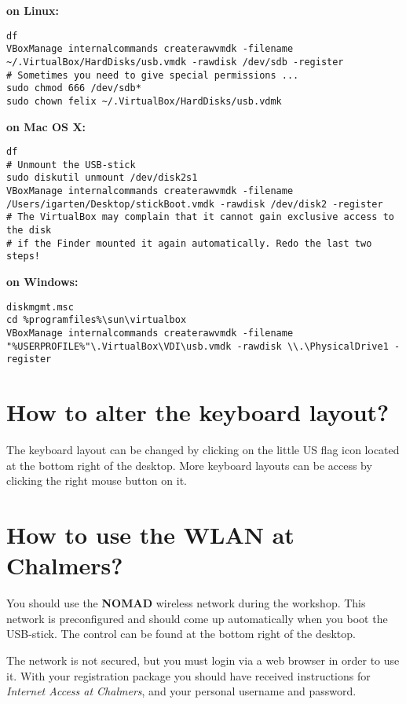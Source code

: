 \documentclass[11pt,a4paper,twocolumn]{article}
\begin{document}
\begin{htmlonly}

{\bf on Linux:}
\begin{verbatim}
df
VBoxManage internalcommands createrawvmdk -filename ~/.VirtualBox/HardDisks/usb.vmdk -rawdisk /dev/sdb -register
# Sometimes you need to give special permissions ...
sudo chmod 666 /dev/sdb*
sudo chown felix ~/.VirtualBox/HardDisks/usb.vdmk
\end{verbatim}

{\bf on Mac OS X:}
\begin{verbatim}
df
# Unmount the USB-stick
sudo diskutil unmount /dev/disk2s1
VBoxManage internalcommands createrawvmdk -filename /Users/igarten/Desktop/stickBoot.vmdk -rawdisk /dev/disk2 -register
# The VirtualBox may complain that it cannot gain exclusive access to the disk 
# if the Finder mounted it again automatically. Redo the last two steps!
\end{verbatim}

{\bf on Windows:}
\begin{verbatim}
diskmgmt.msc
cd %programfiles%\sun\virtualbox
VBoxManage internalcommands createrawvmdk -filename "%USERPROFILE%"\.VirtualBox\VDI\usb.vmdk -rawdisk \\.\PhysicalDrive1 -register
\end{verbatim}
\end{htmlonly}

\section{How to alter the keyboard layout?}

The keyboard layout can be changed by clicking on the little US flag icon
located at the bottom right of the desktop. More keyboard layouts can be access
by clicking the right mouse button on it.

\section{How to use the WLAN at Chalmers?}

You should use the {\bf NOMAD} wireless network during the workshop. This network
is preconfigured and should come up automatically when you boot the USB-stick. The
control can be found at the bottom right of the desktop.

The network is not secured, but you must login via a web browser in order to use
it.  With your registration package you should have received instructions for
\emph{Internet Access at Chalmers}, and your personal username and password.
\end{document}
